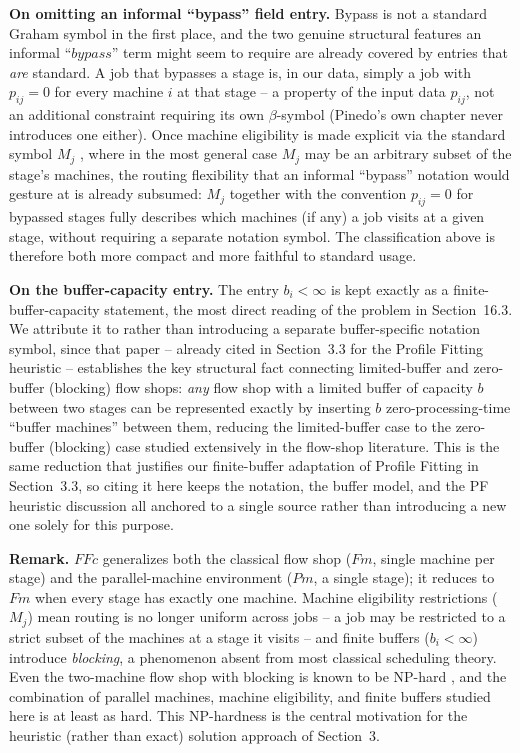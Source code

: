 \documentclass[11pt,a4paper]{article}
\begin{document}
\textbf{On omitting an informal ``bypass'' field entry.} Bypass is not a
standard Graham symbol in the first place, and the two genuine
structural features an informal ``$bypass$'' term might seem to require
are already covered by entries that \emph{are} standard. A job that
bypasses a stage is, in our data, simply a job with $p_{ij}=0$ for every
machine $i$ at that stage -- a property of the input data $p_{ij}$, not
an additional constraint requiring its own $\beta$-symbol (Pinedo's own
chapter never introduces one either). Once machine eligibility is made
explicit via the standard symbol $M_j$ \citep{pinedo2016scheduling},
where in the most general case $M_j$ may be an arbitrary subset of the
stage's machines, the routing flexibility that an informal ``bypass''
notation would gesture at is already subsumed: $M_j$ together with the
convention $p_{ij}=0$ for bypassed stages fully describes which machines
(if any) a job visits at a given stage, without requiring a separate
notation symbol. The classification above is therefore both more compact
and more faithful to standard usage.

\textbf{On the buffer-capacity entry.} The entry $b_i<\infty$ is kept
exactly as a finite-buffer-capacity statement, the most direct reading
of the problem in Section~16.3. We attribute it to
\citet{mccormick1989sequencing} rather than introducing a separate
buffer-specific notation symbol, since that paper -- already cited in
Section~3.3 for the Profile Fitting heuristic -- establishes the
key structural fact connecting limited-buffer and zero-buffer (blocking)
flow shops: \emph{any} flow shop with a limited buffer of capacity $b$
between two stages can be represented exactly by inserting $b$
zero-processing-time ``buffer machines'' between them, reducing the
limited-buffer case to the zero-buffer (blocking) case studied
extensively in the flow-shop literature. This is the same reduction
that justifies our finite-buffer adaptation of Profile Fitting in
Section~3.3, so citing it here keeps the notation, the buffer model, and
the PF heuristic discussion all anchored to a single source rather than
introducing a new one solely for this purpose.

\textbf{Remark.} $FFc$ generalizes both the classical flow shop ($Fm$,
single machine per stage) and the parallel-machine environment
($Pm$, a single stage); it reduces to $Fm$ when every stage has exactly
one machine. Machine eligibility restrictions ($M_j$) mean routing is no
longer uniform across jobs -- a job may be restricted to a strict subset
of the machines at a stage it visits -- and finite buffers ($b_i<\infty$)
introduce \emph{blocking}, a phenomenon absent from most classical
scheduling theory. Even the two-machine flow shop with blocking is known
to be NP-hard \citep{hall1996machine}, and the combination of parallel
machines, machine eligibility, and finite buffers studied here is at
least as hard. This NP-hardness is the central motivation for the
heuristic (rather than exact) solution approach of Section~3.
\end{document}

